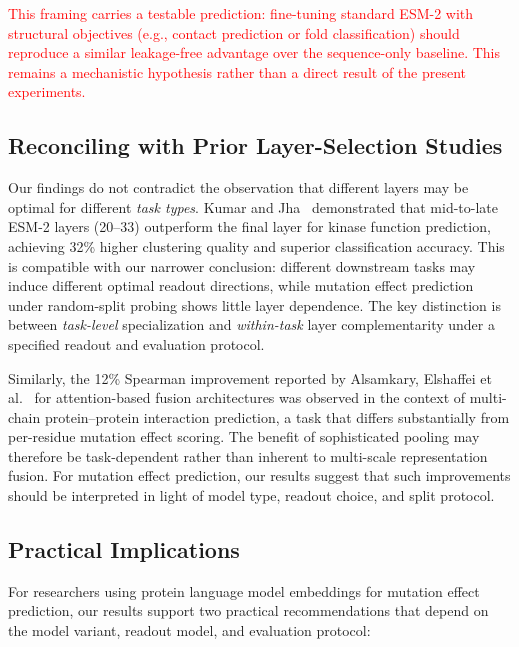 \documentclass[11pt,a4paper]{article}
\newcommand{\revised}[1]{\textcolor{red}{#1}}
\begin{document}
\revised{This framing carries a testable prediction: fine-tuning standard ESM-2
with structural objectives (e.g., contact prediction or fold classification)
should reproduce a similar leakage-free advantage over the sequence-only baseline.
This remains a mechanistic hypothesis rather than a direct result of the present
experiments.}

\subsection{Reconciling with Prior Layer-Selection Studies}

Our findings do not contradict the observation that different layers may be
optimal for different \emph{task types}. Kumar and Jha~\cite{kumar2025}
demonstrated that mid-to-late ESM-2 layers (20--33) outperform the final layer
for kinase function prediction, achieving 32\% higher clustering quality and
superior classification accuracy. This is compatible with our narrower conclusion:
different downstream tasks may induce different optimal readout directions, while
mutation effect prediction under random-split probing shows little layer dependence.
The key distinction is between \emph{task-level} specialization and
\emph{within-task} layer complementarity under a specified readout and evaluation
protocol.

Similarly, the 12\% Spearman improvement reported by Alsamkary, Elshaffei
et al.~\cite{elshaffei2025} for attention-based fusion architectures was
observed in the context of multi-chain protein--protein interaction prediction,
a task that differs substantially from per-residue mutation effect scoring.
The benefit of sophisticated pooling may therefore be task-dependent rather than
inherent to multi-scale representation fusion. For mutation effect prediction,
our results suggest that such improvements should be interpreted in light of
model type, readout choice, and split protocol.

\subsection{Practical Implications}

For researchers using protein language model embeddings for mutation effect
prediction, our results support two practical recommendations that depend on
the model variant, readout model, and evaluation protocol:
\end{document}
